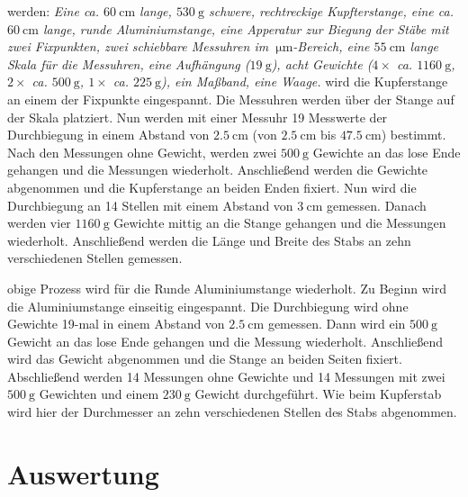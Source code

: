 \justifying werden: \textit{ Eine ca. $\SI{60}{\centi\meter}$ lange, $\SI{530}{\gram}$ schwere, rechtreckige Kupfterstange, eine ca. $\SI{60}{\centi\meter}$ lange, runde
Aluminiumstange, eine Apperatur zur Biegung der Stäbe mit zwei Fixpunkten, zwei schiebbare Messuhren im $\SI{}{\micro\meter}$-Bereich, eine
$\SI{55}{\centi\meter}$ lange Skala für die Messuhren, eine Aufhängung ($\SI{19}{\gram}$), acht Gewichte ($4\times$ ca. $\SI{1160}{\gram}$, 
$2\times$ ca. $\SI{500}{\gram}$, $1\times$ ca. $\SI{225}{\gram}$), ein Maßband, eine Waage.
}
\justifying wird die Kupferstange an einem der Fixpunkte eingespannt. Die Messuhren werden über der Stange auf der Skala platziert. Nun werden mit 
einer Messuhr 19 Messwerte der Durchbiegung in einem Abstand von $\SI{2.5}{\centi\meter}$ (von $\SI{2.5}{\centi\meter}$ bis $\SI{47.5}{\centi\meter}$) 
bestimmt. Nach den Messungen ohne Gewicht, werden zwei $\SI{500}{\gram}$ Gewichte an das lose Ende gehangen und die Messungen wiederholt. Anschließend
werden die Gewichte abgenommen und die Kupferstange an beiden Enden fixiert. Nun wird die Durchbiegung an 14 Stellen mit einem Abstand von 
$\SI{3}{\centi\meter}$ gemessen. Danach werden vier $\SI{1160}{\gram}$ Gewichte mittig an die Stange gehangen und die Messungen wiederholt. 
Anschließend werden die Länge und Breite des Stabs an zehn verschiedenen Stellen gemessen.

\justifying obige Prozess wird für die Runde Aluminiumstange wiederholt. Zu Beginn wird die Aluminiumstange einseitig eingespannt. Die Durchbiegung
wird ohne Gewichte 19-mal in einem Abstand von $\SI{2.5}{\centi\meter}$ gemessen. Dann wird ein $\SI{500}{\gram}$ Gewicht an das lose Ende 
gehangen und die Messung wiederholt. Anschließend wird das Gewicht abgenommen und die Stange an beiden Seiten fixiert. Abschließend werden 
14 Messungen ohne Gewichte und 14 Messungen mit zwei $\SI{500}{\gram}$ Gewichten und einem $\SI{230}{\gram}$ Gewicht durchgeführt. Wie beim Kupferstab
wird hier der Durchmesser an zehn verschiedenen Stellen des Stabs abgenommen.


\section{Auswertung}\justifying


